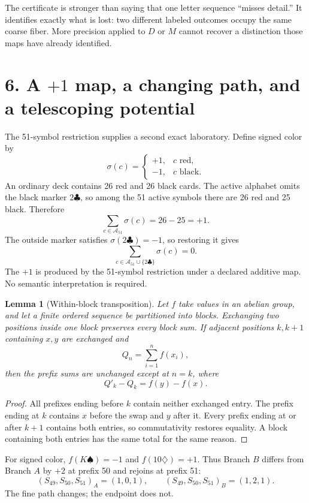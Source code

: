 \documentclass[9pt]{extarticle}
\theoremstyle{cgplain}
\newtheorem{lemma}{Lemma}
\theoremstyle{definition}
\newcommand{\A}{\mathcal A_{51}}
\newcommand{\sgncol}{\sigma}
\begin{document}
The certificate is stronger than saying that one letter sequence ``misses detail.'' It identifies exactly what is lost: two different labeled outcomes occupy the same coarse fiber. More precision applied to $D$ or $M$ cannot recover a distinction those maps have already identified.

\section*{6. A $+1$ map, a changing path, and a telescoping potential}
The 51-symbol restriction supplies a second exact laboratory. Define signed color by
\[
\sgncol(c)=\begin{cases}
+1,&c\text{ red},\\
-1,&c\text{ black}.
\end{cases}
\tag{16}
\]
An ordinary deck contains 26 red and 26 black cards. The active alphabet omits the black marker $2\clubsuit$, so among the 51 active symbols there are 26 red and 25 black. Therefore
\[
\boxed{\sum_{c\in\A}\sgncol(c)=26-25=+1.}
\tag{17}
\]
The outside marker satisfies $\sgncol(2\clubsuit)=-1$, so restoring it gives
\[
\boxed{\sum_{c\in\A\cup\{2\clubsuit\}}\sgncol(c)=0.}
\tag{18}
\]
The $+1$ is produced by the 51-symbol restriction under a declared additive map. No semantic interpretation is required.

\begin{lemma}[Within-block transposition]
Let $f$ take values in an abelian group, and let a finite ordered sequence be partitioned into blocks. Exchanging two positions inside one block preserves every block sum. If adjacent positions $k,k+1$ containing $x,y$ are exchanged and
\[
Q_n=\sum_{i=1}^n f(x_i),
\]
then the prefix sums are unchanged except at $n=k$, where
\[
Q'_k-Q_k=f(y)-f(x).
\tag{19}
\]
\end{lemma}
\begin{proof}
All prefixes ending before $k$ contain neither exchanged entry. The prefix ending at $k$ contains $x$ before the swap and $y$ after it. Every prefix ending at or after $k+1$ contains both entries, so commutativity restores equality. A block containing both entries has the same total for the same reason.
\end{proof}

For signed color, $f(K\spadesuit)=-1$ and $f(10\diamondsuit)=+1$. Thus Branch $B$ differs from Branch $A$ by $+2$ at prefix 50 and rejoins at prefix 51:
\[
(S_{49},S_{50},S_{51})_A=(1,0,1),\qquad
(S_{49},S_{50},S_{51})_B=(1,2,1).
\tag{20}
\]
The fine path changes; the endpoint does not.
\end{document}
